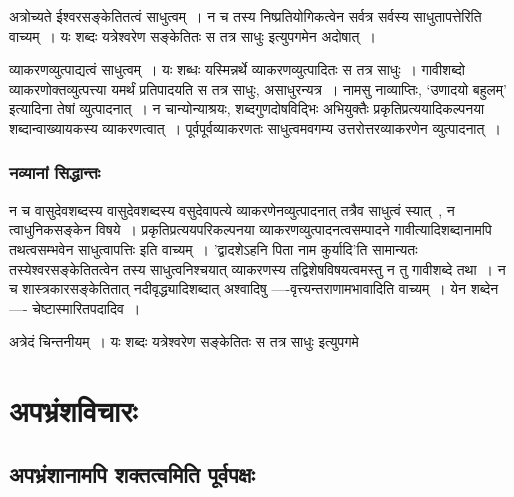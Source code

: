 				अत्रोच्यते ईश्वरसङ्केतितत्वं साधुत्वम्~। न च तस्य निष्प्रतियोगिकत्वेन सर्वत्र सर्वस्य साधुतापत्तेरिति वाच्यम्~। यः शब्दः यत्रेश्वरेण सङ्केतितः स तत्र साधुः इत्युपगमेन अदोषात्~। 

				व्याकरणव्युत्पाद्यत्वं साधुत्वम्~। यः शब्धः यस्मिन्नर्थे व्याकरणव्युत्पादितः स तत्र साधुः~। गावीशब्दो व्याकरणोक्तव्युत्पत्त्या यमर्थं प्रतिपादयति स तत्र साधुः, असाधुरन्यत्र~। नामसु नाव्याप्तिः, ‘उणादयो बहुलम्’ इत्यादिना तेषां व्युत्पादनात्~। न चान्योन्याश्रयः, शब्दगुणदोषविद्भिः अभियुक्तैः प्रकृतिप्रत्ययादिकल्पनया शब्दान्वाख्यायकस्य व्याकरणत्वात्~। पूर्वपूर्वव्याकरणतः साधुत्वमवगम्य उत्तरोत्तरव्याकरणेन व्युत्पादनात्~।

			\subsubsection{नव्यानां सिद्धान्तः}

				न च वासुदेवशब्दस्य वासुदेवशब्दस्य वसुदेवापत्ये व्याकरणेनव्युत्पादनात् तत्रैव साधुत्वं स्यात्~, न त्वाधुनिकसङ्केन विषये~। प्रकृतिप्रत्ययपरिकल्पनया व्याकरणव्युत्पादनत्वसम्पादने गावीत्यादिशब्दानामपि तथत्वसम्भवेन साधुत्वापत्तिः इति वाच्यम्~। ’द्वादशेऽहनि पिता नाम कुर्यादि’ति सामान्यतः तस्येश्वरसङ्केतितत्वेन तस्य साधुत्वनिश्चयात् व्याकरणस्य तद्विशेषविषयत्वमस्तु न तु गावीशब्दे तथा~। न च शास्त्रकारसङ्केतितात् नदीवृद्ध्यादिशब्दात् अश्वादिषु ----वृत्त्यन्तराणामभावादिति वाच्यम्~। येन शब्देन ---- चेष्टास्मारितपदादिव~।
				
				अत्रेदं चिन्तनीयम्~। यः शब्दः यत्रेश्वरेण सङ्केतितः स तत्र साधुः इत्युपगमे  
	
	\section{अपभ्रंशविचारः}

		\subsection{अपभ्रंशानामपि शक्तत्वमिति पूर्वपक्षः}
		
